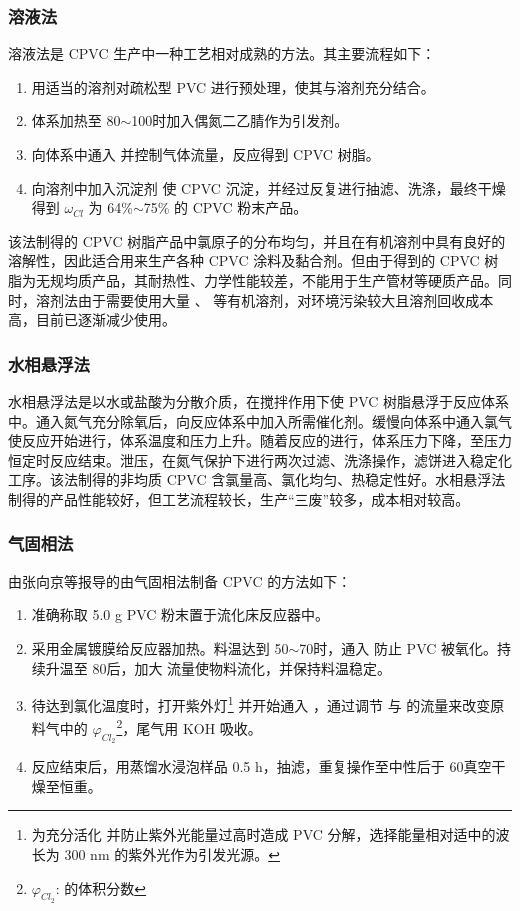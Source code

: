 \subsubsection{溶液法}

溶液法是 CPVC 生产中一种工艺相对成熟的方法。其主要流程如下：

\begin{enumerate}[(1) ]
	\item 用适当的溶剂对疏松型 PVC 进行预处理，使其与溶剂充分结合。
	\item 体系加热至 80$\sim$100\cd 时加入偶氮二乙腈作为引发剂。
	\item 向体系中通入  并控制气体流量，反应得到 CPVC 树脂。
	\item 向溶剂中加入沉淀剂  使 CPVC 沉淀，并经过反复进行抽滤、洗涤，最终干燥得到 $\omega_{Cl}$ 为 64\%$\sim$75\% 的 CPVC 粉末产品。
\end{enumerate}

该法制得的 CPVC 树脂产品中氯原子的分布均匀，并且在有机溶剂中具有良好的溶解性，因此适合用来生产各种 CPVC 涂料及黏合剂。但由于得到的 CPVC 树脂为无规均质产品，其耐热性、力学性能较差，不能用于生产管材等硬质产品。同时，溶剂法由于需要使用大量 、 等有机溶剂，对环境污染较大且溶剂回收成本高，目前已逐渐减少使用。

\subsubsection{水相悬浮法}
水相悬浮法是以水或盐酸为分散介质，在搅拌作用下使 PVC 树脂悬浮于反应体系中。通入氮气充分除氧后，向反应体系中加入所需催化剂。缓慢向体系中通入氯气使反应开始进行，体系温度和压力上升。随着反应的进行，体系压力下降，至压力恒定时反应结束。泄压，在氮气保护下进行两次过滤、洗涤操作，滤饼进入稳定化工序\cite{23}。该法制得的非均质 CPVC 含氯量高、氯化均匀、热稳定性好。水相悬浮法制得的产品性能较好，但工艺流程较长，生产“三废”较多，成本相对较高。

\subsubsection{气固相法}
由张向京等\cite{1}报导的由气固相法制备 CPVC 的方法如下：

\begin{enumerate}[(1) ]
    \item 准确称取 5.0 g PVC 粉末置于流化床反应器中。
    \item 采用金属镀膜给反应器加热。料温达到 50$\sim$70\cd 时，通入  防止 PVC 被氧化。持续升温至 80\cd 后，加大  流量使物料流化，并保持料温稳定。
    \item 待达到氯化温度时，打开紫外灯\footnote{为充分活化  并防止紫外光能量过高时造成 PVC 分解，选择能量相对适中的波长为 300 nm 的紫外光作为引发光源。} 并开始通入 ，通过调节  与  的流量来改变原料气中的 $\varphi_{Cl_2}$\footnote{$\varphi_{Cl_2}$:  的体积分数}，尾气用 KOH 吸收。
    \item 反应结束后，用蒸馏水浸泡样品 0.5 h，抽滤，重复操作至中性后于 60\cd 真空干燥至恒重。
\end{enumerate}

